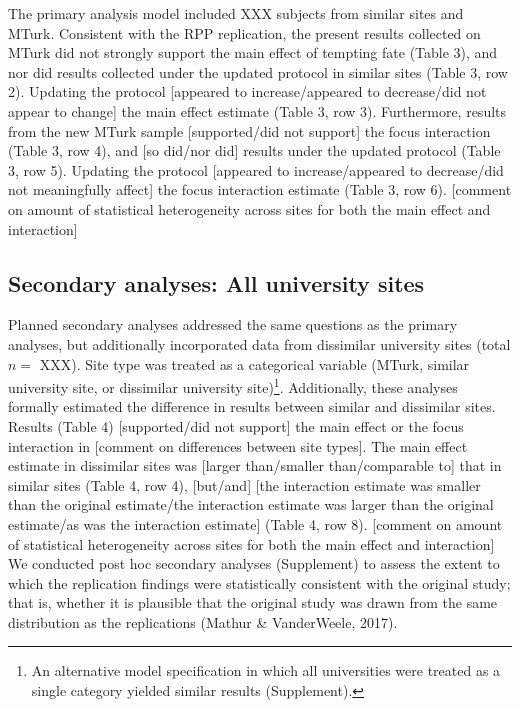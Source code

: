 \documentclass[english,floatsintext,man]{apa6}
\theoremstyle{definition}
\theoremstyle{definition}
\theoremstyle{definition}
\theoremstyle{remark}
\begin{document}
The primary analysis model included XXX subjects from similar sites and
MTurk. Consistent with the RPP replication, the present results
collected on MTurk did not strongly support the main effect of tempting
fate (Table 3), and nor did results collected under the updated protocol
in similar sites (Table 3, row 2). Updating the protocol {[}appeared to
increase/appeared to decrease/did not appear to change{]} the main
effect estimate (Table 3, row 3). Furthermore, results from the new
MTurk sample {[}supported/did not support{]} the focus interaction
(Table 3, row 4), and {[}so did/nor did{]} results under the updated
protocol (Table 3, row 5). Updating the protocol {[}appeared to
increase/appeared to decrease/did not meaningfully affect{]} the focus
interaction estimate (Table 3, row 6). {[}comment on amount of
statistical heterogeneity across sites for both the main effect and
interaction{]}

\subsection{Secondary analyses: All university
sites}\label{secondary-analyses-all-university-sites}

Planned secondary analyses addressed the same questions as the primary
analyses, but additionally incorporated data from dissimilar university
sites (total \(n=\) XXX). Site type was treated as a categorical
variable (MTurk, similar university site, or dissimilar university
site)\footnote{An alternative model specification in which all
  universities were treated as a single category yielded similar results
  (Supplement).}. Additionally, these analyses formally estimated the
difference in results between similar and dissimilar sites. Results
(Table 4) {[}supported/did not support{]} the main effect or the focus
interaction in {[}comment on differences between site types{]}. The main
effect estimate in dissimilar sites was {[}larger than/smaller
than/comparable to{]} that in similar sites (Table 4, row 4),
{[}but/and{]} {[}the interaction estimate was smaller than the original
estimate/the interaction estimate was larger than the original
estimate/as was the interaction estimate{]} (Table 4, row 8). {[}comment
on amount of statistical heterogeneity across sites for both the main
effect and interaction{]} We conducted post hoc secondary analyses
(Supplement) to assess the extent to which the replication findings were
statistically consistent with the original study; that is, whether it is
plausible that the original study was drawn from the same distribution
as the replications (Mathur \& VanderWeele, 2017).
\end{document}
